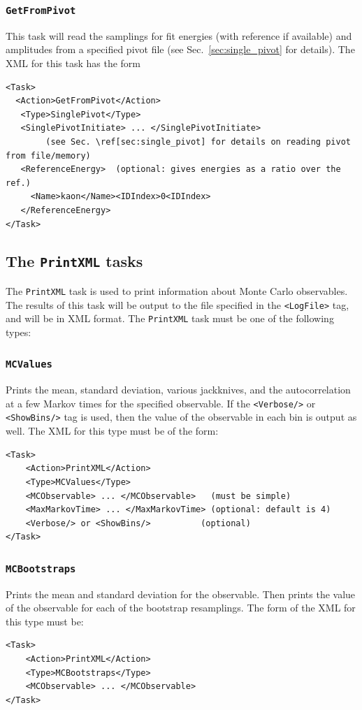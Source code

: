 \documentclass[12pt]{article}
\newcommand{\vb}{\texttt}
\begin{document}
\subsubsection{\vb{GetFromPivot}} \label{sec:getFromPivot}
This task will read the samplings for fit energies (with reference if available) and
amplitudes from a specified pivot file (see Sec.~\ref{sec:single_pivot} for details).
The XML for this task has the form
\begin{Verbatim}[commandchars=\\\[\]]
<Task>
  <Action>GetFromPivot</Action>
   <Type>SinglePivot</Type>
   <SinglePivotInitiate> ... </SinglePivotInitiate>
        (see Sec. \ref[sec:single_pivot] for details on reading pivot from file/memory)
   <ReferenceEnergy>  (optional: gives energies as a ratio over the ref.)
     <Name>kaon</Name><IDIndex>0<IDIndex>
   </ReferenceEnergy>
</Task>
\end{Verbatim}

\subsection{The \vb{PrintXML} tasks}  
\label{sec:print_xml}

The \vb{PrintXML} task is used to print information about Monte Carlo observables.
The results of this task will be output to the file specified in the
\vb{<LogFile>} tag, and will be in XML format.
The \vb{PrintXML} task must be one of the following types:

\subsubsection{\vb{MCValues}}
Prints the mean, standard deviation, various jackknives, and
the autocorrelation at a few Markov times for the specified observable.
If the \vb{<Verbose/>} or \vb{<ShowBins/>} tag is used, then the value of the observable in
each bin is output as well. The XML for this type must be of the form:
\begin{verbatim}
<Task>
    <Action>PrintXML</Action>
    <Type>MCValues</Type>
    <MCObservable> ... </MCObservable>   (must be simple)
    <MaxMarkovTime> ... </MaxMarkovTime> (optional: default is 4)
    <Verbose/> or <ShowBins/>          (optional)
</Task>
\end{verbatim}
\subsubsection{\vb{MCBootstraps}}
Prints the mean and standard deviation for the observable.
Then prints the value of the observable for each of the bootstrap resamplings.
The form of the XML for this type must be:
\begin{verbatim}
<Task>
    <Action>PrintXML</Action>
    <Type>MCBootstraps</Type>
    <MCObservable> ... </MCObservable>
</Task>
\end{verbatim}
\end{document}

